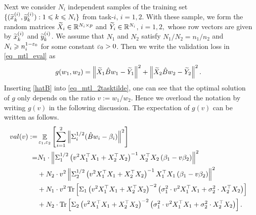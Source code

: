 Next we consider $N_i$ independent samples of the training set $\{(\widetilde x_k^{(i)},\widetilde y_k^{(i)}): 1\leqslant k \leqslant N_i\}$ from task-$i$, $i=1,2$. With these sample, we form the random matrices $\widetilde X_i \in \mathbb{R}^{N_i\times p}$ and $\widetilde Y_i\in \mathbb{R}^{N_i}$, $i=1,2,$ whose row vectors are given by $\widetilde x_k^{(i)}$ and $\widetilde y_k^{(i)}$. We assume that $N_1$ and $N_2$ satisfy $N_1/N_2=n_1/n_2$ and $N_i \geqslant n_i^{1-{\varepsilon}_0}$ for some constant ${\varepsilon}_0>0$. Then we write the validation loss in \eqref{eq_mtl_eval} as
\begin{align}\label{eq_mtl_2tasktilde}
	g(w_1,w_2) = \left\| \widetilde X_1 \hat B w_1 - \widetilde Y_1 \right\|^2 + \left\| \widetilde X_2 \hat B w_2 - \widetilde Y_2 \right\|^2.
\end{align}
Inserting \eqref{hatB} into \eqref{eq_mtl_2tasktilde}, one can see that the optimal solution of $g$ only depends on the ratio $v:=w_1/w_2$.
Hence we overload the notation by writing $g(v)$ in the following discussion.
The expectation of $g(v)$ can be written as follows.
\begin{align*}
		val(v) :=& \mathop{\mathbb{E}}_{\varepsilon_1,{\varepsilon}_2}\left[ \sum_{i=1}^2 \left\|\Sigma_i^{1/2}( \hat B w_i - \beta_i) \right\|^2 \right] \\
	=&  N_1 \cdot \left\| \Sigma_1^{1/2}\left(v^2 X_1^{\top}X_1 + X_2^{\top}X_2\right)^{-1}X_2^{\top}X_2\left (\beta_1 - v\beta_2\right) \right\|^2 \nonumber \\
	&+ N_2 \cdot v^2\left\| \Sigma_2^{1/2}\left(v^2 X_1^{\top}X_1 + X_2^{\top}X_2\right)^{-1}X_1^{\top}X_1\left(\beta_1 - v\beta_2\right) \right\|^2 \nonumber \\
		&+ N_1   \cdot v^2 \operatorname{Tr}\left[\Sigma_1\left(v^2 X_1^{\top}X_1 + X_2^{\top}X_2\right)^{-2} \left(\sigma_1^2 \cdot v^2X_1^{\top}X_1 + \sigma_2^2 \cdot X_2^{\top}X_2\right)\right] \nonumber \\
		&+ N_2  \cdot \operatorname{Tr}\left[\Sigma_2\left(v^2 X_1^{\top}X_1 + X_2^{\top}X_2\right)^{-2} \left(\sigma_1^2 \cdot v^2  X_1^{\top}X_1 + \sigma_2^2  \cdot X_2^{\top}X_2\right)\right]. \label{eq_val_mtl}
\end{align*}

